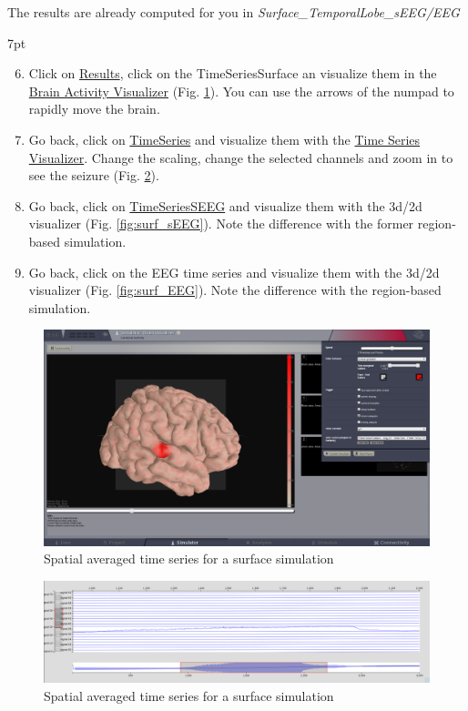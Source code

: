 \documentclass{tufte-handout}
\newenvironment{simulation}{%
  \def\FrameCommand{%
    \hspace{1pt}%
    {\color{ForestGreen}\vrule width 2pt}%
    {\color{simulationshade}\vrule width 4pt}%
    \colorbox{simulationshade}%
  }%
  \MakeFramed{\advance\hsize-\width\FrameRestore}%
  \noindent\hspace{-4.55pt}%
  \begin{adjustwidth}{}{7pt}%
  \vspace{2pt}\vspace{2pt}%
}
{%
  \vspace{2pt}\end{adjustwidth}\endMakeFramed%
}
\begin{document}
  The results are already computed for you in \textit{Surface\_TemporalLobe\_sEEG/EEG}
 \begin{simulation}
  \begin{enumerate}
     \setcounter{enumi}{5}
  \item Click on \underline{Results}, click on the TimeSeriesSurface an visualize them in the 
  \underline{Brain Activity Visualizer} (Fig. \ref{fig:bv_surf}). You can use the arrows of the numpad to rapidly 
  move the brain.
  \item Go back,  click on \underline{TimeSeries} and visualize them with the \underline{Time Series Visualizer}. Change the scaling, change the selected channels and zoom in to see
  the seizure (Fig. \ref{fig:ts_surf}).
  \item Go back, click on \underline{TimeSeriesSEEG} and visualize them with the 3d/2d visualizer (Fig. \ref{fig:surf_sEEG}).
  Note the difference with the former region-based simulation.
  \item Go back, click on the EEG time series and visualize them with the 3d/2d visualizer (Fig. \ref{fig:surf_EEG}).
  Note the difference with the region-based simulation.
\end{enumerate}
\end{simulation}

\begin{figure}[h]
  \includegraphics[width=\linewidth]{Handout_UI_ModellingAnEpilepticPatient_TemporalAverageTimeSeriesSurface}%
  \caption{Spatial averaged time series for a surface simulation}%
  \label{fig:bv_surf}%
\end{figure}

\begin{figure}[h]
  \includegraphics[width=\linewidth]{Handout_UI_ModellingAnEpilepticPatient_SpatialAverageTimeSeries}%
  \caption{Spatial averaged time series for a surface simulation}%
  \label{fig:ts_surf}%
\end{figure}
\end{document}
